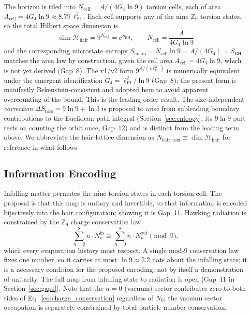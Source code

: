 \documentclass[11pt,a4paper]{article}
\begin{document}
The horizon is tiled into $N_{\mathrm{cell}} = A/(4G_4\ln 9)$ torsion cells,
each of area $A_{\mathrm{cell}} = 4G_4\ln 9 \approx 8.79\,\ell_{\mathrm{Pl}}^2$.
Each cell supports any of the nine $\mathbb{Z}_9$ torsion states, so the
total Hilbert space dimension is
\begin{equation}
  \boxed{\dim\mathcal{H}_{\mathrm{hair}}
    = 9^{N_{\mathrm{cell}}}
    = e^{S_{\mathrm{BH}}},
    \qquad
    N_{\mathrm{cell}} = \frac{A}{4G_4\ln 9}}
  \label{eq:N_hair}
\end{equation}
and the corresponding microstate entropy
$S_{\mathrm{micro}} = N_{\mathrm{cell}}\ln 9 = A/(4G_4) = S_{\mathrm{BH}}$
matches the area law by construction, given the cell area
$A_{\mathrm{cell}} = 4G_4\ln 9$, which is not yet derived (Gap~8).  The v1/v2 form $9^{A/(4\ell_{\mathrm{Pl}}^2)}$ is numerically
equivalent under the emergent identification $G_4 = \ell_{\mathrm{Pl}}^2/\ln 9$
(Gap~8); the present form is manifestly Bekenstein-consistent and adopted here
to avoid apparent overcounting of the bound.
This is the leading-order result.  The size-independent \emph{correction}
$\Delta S_{\mathrm{tors}} = 9\ln 9 + \ln 3$ is proposed to arise from subleading boundary
contributions to the Euclidean path integral (Section~\ref{sec:entropy}; its $9\ln 9$ part rests on counting the orbit once, Gap~12) and is
distinct from the leading term above.  We abbreviate the hair-lattice dimension
as $N_{\mathrm{hair,tors}} \equiv \dim\mathcal{H}_{\mathrm{hair}}$ for reference
in what follows.

\subsection{Information Encoding}

Infalling matter permutes the nine torsion states in each torsion cell.  The proposal is that this map is unitary and invertible, so that information
is encoded bijectively into the hair configuration; showing it is Gap~11.  Hawking radiation is constrained
by the $\mathbb{Z}_9$ charge conservation law
\begin{equation}
  \sum_{n=0}^{8} n \cdot N_n^{\mathrm{in}} \equiv \sum_{n=0}^{8} n \cdot N_n^{\mathrm{out}} \pmod{9},
  \label{eq:charge_conservation}
\end{equation}
which every evaporation history must respect.  A single mod-9 conservation law
fixes one number, so it carries at most $\ln 9 \approx 2.2$ nats about the
infalling state; it is a necessary condition for the proposed encoding, not by
itself a demonstration of unitarity.  The full map from infalling state to
radiation is open (Gap~11 in Section~\ref{sec:gaps}).
Note that the $n=0$ (vacuum) sector contributes zero to both sides of
Eq.~\eqref{eq:charge_conservation} regardless of $N_0$; the vacuum sector
occupation is separately constrained by total particle-number conservation.
\end{document}
